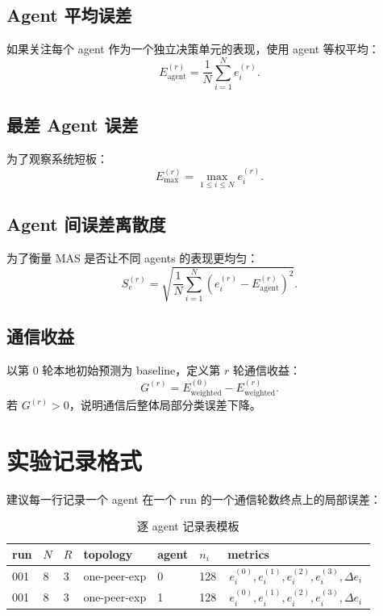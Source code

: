 \documentclass[UTF8,11pt,a4paper,fontset=fandol]{ctexart}
\begin{document}
\subsection{Agent 平均误差}

如果关注每个 agent 作为一个独立决策单元的表现，使用 agent 等权平均：
\[
E_{\mathrm{agent}}^{(r)}
=
\frac{1}{N}\sum_{i=1}^{N}e_i^{(r)}.
\]

\subsection{最差 Agent 误差}

为了观察系统短板：
\[
E_{\max}^{(r)}
=
\max_{1\leq i\leq N} e_i^{(r)}.
\]

\subsection{Agent 间误差离散度}

为了衡量 MAS 是否让不同 agents 的表现更均匀：
\[
S_e^{(r)}
=
\sqrt{\frac{1}{N}\sum_{i=1}^{N}
\left(e_i^{(r)}-E_{\mathrm{agent}}^{(r)}\right)^2}.
\]

\subsection{通信收益}

以第 \(0\) 轮本地初始预测为 baseline，定义第 \(r\) 轮通信收益：
\[
G^{(r)}
=
E_{\mathrm{weighted}}^{(0)}
-
E_{\mathrm{weighted}}^{(r)}.
\]
若 \(G^{(r)}>0\)，说明通信后整体局部分类误差下降。

\section{实验记录格式}

建议每一行记录一个 agent 在一个 run 的一个通信轮数终点上的局部误差：

\begin{table}[h]
\centering
\caption{逐 agent 记录表模板}
\small
\begin{tabularx}{\linewidth}{llllllX}
\toprule
run & \(N\) & \(R\) & topology & agent & \(n_i\) & metrics \\
\midrule
001 & 8 & 3 & one-peer-exp & 0 & 128 &
\(\,e_i^{(0)}, e_i^{(1)}, e_i^{(2)}, e_i^{(3)}, \Delta e_i\,\) \\
001 & 8 & 3 & one-peer-exp & 1 & 128 &
\(\,e_i^{(0)}, e_i^{(1)}, e_i^{(2)}, e_i^{(3)}, \Delta e_i\,\) \\
\bottomrule
\end{tabularx}
\end{table}
\end{document}

